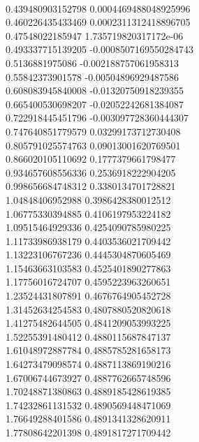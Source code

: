 { \\
0.439480903152798 0.0004469488048925996
 \\
0.460226435433469 0.0002311312418896705
 \\
0.47548022185947 1.735719820317172e-06
 \\
0.493337715139205 -0.0008507169550284743
 \\
0.5136881975086 -0.002188757061958313
 \\
0.55842373901578 -0.00504896929487586
 \\
0.608083945840008 -0.01320750918239355
 \\
0.665400530698207 -0.02052242681384087
 \\
0.722918445451796 -0.003097728360444307
 \\
0.747640851779579 0.03299173712730408
 \\
0.805791025574763 0.09013001620769501
 \\
0.866020105110692 0.1777379661798477
 \\
0.934657608556336 0.2536918222904205
 \\
0.998656684748312 0.3380134701728821
 \\
1.04848406952988 0.3986428380012512
 \\
1.06775330394885 0.4106197953224182
 \\
1.09515464929336 0.4254090785980225
 \\
1.11733986938179 0.4403536021709442
 \\
1.13223106767236 0.4445304870605469
 \\
1.15463663103583 0.4525401890277863
 \\
1.17756016724707 0.4595223963260651
 \\
1.23524431807891 0.4676764905452728
 \\
1.31452634254583 0.4807880520820618
 \\
1.41275482644505 0.4841209053993225
 \\
1.52255391480412 0.4880115687847137
 \\
1.61048972887784 0.4885785281658173
 \\
1.64273479098574 0.4887113869190216
 \\
1.67006744673927 0.4887762665748596
 \\
1.70248871380863 0.4889185428619385
 \\
1.74232861131532 0.4890569448471069
 \\
1.76649288401586 0.4891341328620911
 \\
1.77808642201398 0.4891817271709442
 \\
}
